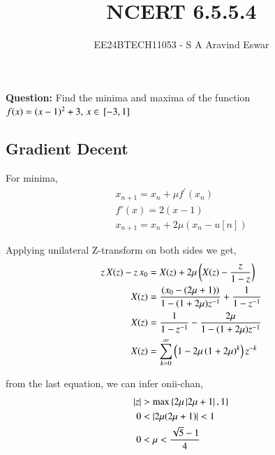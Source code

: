 \documentclass[journal]{IEEEtran}
\begin{document}

\vspace{3cm}

\title{NCERT 6.5.5.4}
\author{EE24BTECH11053 - S A Aravind Eswar}
{\let\newpage\relax\maketitle}

\renewcommand{\thefigure}{\theenumi}
\renewcommand{\thetable}{\theenumi}
\setlength{\intextsep}{10pt} %

\textbf{Question:} Find the minima and maxima of the function $f(x) = (x-1)^2 + 3,\,x \in {}\left[-3, 1\right]$

\subsection{Gradient Decent}
For minima,
\begin{align}
    x_{n+1} = x_n + \mu f^\prime(x_n)\\
    f\prime(x) = 2(x-1)\\
    x_{n+1} = x_n + 2\mu (x_n-u[n])
\end{align}

Applying unilateral Z-transform on both sides we get,
\begin{align}
    z \,X(z) - z\,x_0 &= X(z) + 2\mu\left(X(z) - \frac{z}{1-z}\right)\\
    X(z) &= \frac{(x_0 - (2\mu+1))}{1-(1+2\mu)z^{-1}} + \frac{1}{1-z^{-1}}\\
    X(z) &= \frac{1}{1-z^{-1}} - \frac{2\mu}{1-(1+2\mu)z^{-1}}\\
    X(z) &= \sum_{k=0}^{\infty} \left(1 - 2\mu\left(1+2\mu\right)^k\right)z^{-k}
\end{align}

from the last equation, we can infer onii-chan,
\begin{align}
    \left\vert z\right\vert &> \max{\ensuremath{\left\{2\mu\left\vert2\mu + 1\right\vert,1\right\}}}\\
    0 &< \left\vert2\mu(2\mu + 1)\right\vert < 1\\
    0 &< \mu < \frac{\sqrt{5}-1}{4}
\end{align}
\end{document}

